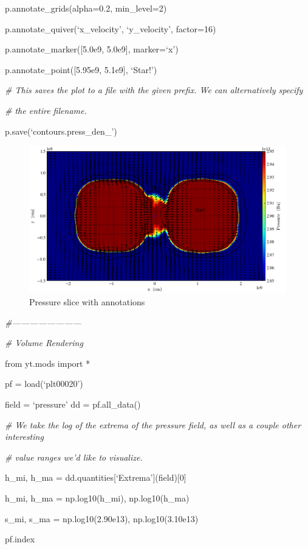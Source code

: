 p.annotate\_grids(alpha=0.2, min\_level=2)

p.annotate\_quiver(`x\_velocity', `y\_velocity', factor=16)

p.annotate\_marker([5.0e9, 5.0e9], marker=`x')

p.annotate\_point([5.95e9, 5.1e9], `Star!')

{\it\# This saves the plot to a file with the given prefix. We can alternatively specify}
{\setlength{\parskip}{0pt}

{\it\# the entire filename.}

p.save(`contours.press\_den\_')
}
\begin{figure}[h]
\centering
\includegraphics[width=6in]{Slice_z_pressure}
\caption{Pressure slice with annotations}
\end{figure}

{\it\#------------------------}


{\it\# Volume Rendering}
{\setlength{\parskip}{0pt}

from yt.mods import *
}

pf = load(`plt00020')

field = `pressure'
dd = pf.all\_data()

{\it\# We take the log of the extrema of the pressure field, as well as a couple other interesting}
{\setlength{\parskip}{0pt}

{\it\# value ranges we'd like to visualize.}

h\_mi, h\_ma = dd.quantities[`Extrema'](field)[0]
}

h\_mi, h\_ma = np.log10(h\_mi), np.log10(h\_ma)

s\_mi, s\_ma =  np.log10(2.90e13), np.log10(3.10e13)

pf.index

